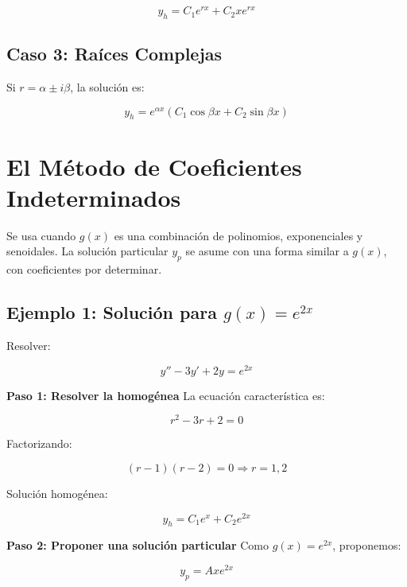 \begin{equation}
y_h = C_1 e^{rx} + C_2 x e^{rx}
\end{equation}

\subsection*{Caso 3: Raíces Complejas}
Si \( r = \alpha \pm i\beta \), la solución es:

\begin{equation}
y_h = e^{\alpha x} \left( C_1 \cos \beta x + C_2 \sin \beta x \right)
\end{equation}

\section{El Método de Coeficientes Indeterminados}
Se usa cuando \( g(x) \) es una combinación de polinomios, exponenciales y senoidales. La solución particular \( y_p \) se asume con una forma similar a \( g(x) \), con coeficientes por determinar.

\subsection*{Ejemplo 1: Solución para \( g(x) = e^{2x} \)}
Resolver:

\begin{equation}
y'' - 3y' + 2y = e^{2x}
\end{equation}

\textbf{Paso 1: Resolver la homogénea}
La ecuación característica es:

\begin{equation}
r^2 - 3r + 2 = 0
\end{equation}

Factorizando:

\begin{equation}
(r - 1)(r - 2) = 0 \Rightarrow r = 1, 2
\end{equation}

Solución homogénea:

\begin{equation}
y_h = C_1 e^x + C_2 e^{2x}
\end{equation}

\textbf{Paso 2: Proponer una solución particular}
Como \( g(x) = e^{2x} \), proponemos:

\begin{equation}
y_p = A x e^{2x}
\end{equation}

